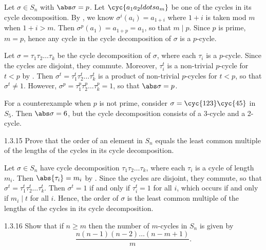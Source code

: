 \begin{soliff}
    \rightimp Let $\sigma \in S_n$ with $\abs\sigma = p$.
	Let $\cyc{a_1 a_2 ldots a_m}$ be one of the cycles in its cycle decomposition.
	By , we know $\sigma^i(a_i) = a_{1 + i}$ where $1 + i$ is taken mod $m$ when $1 + i > m$.
	Then $\sigma^p(a_1) = a_{1 + p} = a_1$, so that $m \mid p$.
	Since $p$ is prime, $m = p$, hence any cycle in the cycle decomposition of $\sigma$ is a $p$-cycle.

    \leftimp Let $\sigma = \tau_1\tau_2 \ldots \tau_k$ be the cycle decomposition of $\sigma$, where each $\tau_i$ is a $p$-cycle.
	Since the cycles are disjoint, they commute.
	Moreover, $\tau_i^t$ is a non-trivial $p$-cycle for $t < p$ by .
	Then $\sigma^t = \tau_1^t\tau_2^t \ldots \tau_k^t$ is a product of non-trivial $p$-cycles for $t < p$, so that $\sigma^t \neq 1$.
	However, $\sigma^p = \tau_1^p\tau_2^p \ldots \tau_k^p = 1$, so that $\abs\sigma = p$.

    For a counterexample when $p$ is not prime, consider $\sigma = \cyc{1 2 3}\cyc{4 5}$ in $S_5$.
	Then $\abs\sigma = 6$, but the cycle decomposition consists of a 3-cycle and a 2-cycle.
\end{soliff}

\begin{exercise}{1.3.15}
    Prove that the order of an element in $S_n$ equals the least common multiple of the lengths of the cycles in its cycle decomposition.
\end{exercise}

\begin{sol}
    Let $\sigma \in S_n$ have cycle decomposition $\tau_1\tau_2 \ldots \tau_k$, where each $\tau_i$ is a cycle of length $m_i$.
	Then $\abs{\tau_i} = m_i$ by .
	Since the cycles are disjoint, they commute, so that $\sigma^t = \tau_1^t\tau_2^t \ldots \tau_k^t$.
	Then $\sigma^t = 1$ if and only if $\tau_i^t = 1$ for all $i$, which occurs if and only if $m_i \mid t$ for all $i$.
	Hence, the order of $\sigma$ is the least common multiple of the lengths of the cycles in its cycle decomposition.
\end{sol}

\begin{spex}{1.3.16}
    Show that if $n \ge m$ then the number of $m$-cycles in $S_n$ is given by
    \[
    	\frac{n(n-1)(n-2)\dots(n-m+1)}{m}.
    \]
\end{spex}

